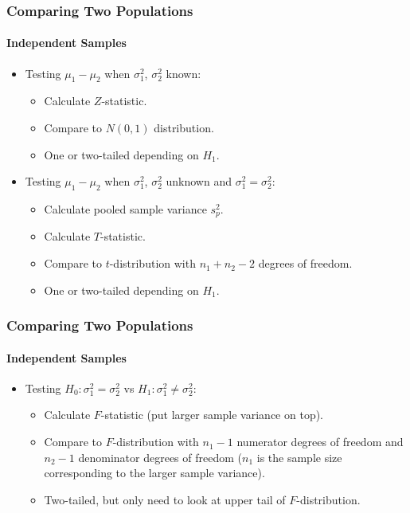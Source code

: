 \documentclass[12pt]{beamer}
\begin{document}
\begin{frame}
	\frametitle{Comparing Two Populations}
	\framesubtitle{Independent Samples}
	
	\begin{itemize}[label={\color{blue}$\blacktriangleright$}]
		\item Testing $\mu_1 - \mu_2$ when $\sigma_1^2$, $\sigma_2^2$ known:
		\begin{itemize}[label={\color{blue}$\blacktriangleright$}]
			\item Calculate $Z$-statistic.
			\item Compare to $N(0,1)$ distribution.
			\item One or two-tailed depending on $H_1$.
		\end{itemize}
		
		\item Testing $\mu_1 - \mu_2$ when $\sigma_1^2$, $\sigma_2^2$ unknown and $\sigma_1^2 = \sigma_2^2$:
		\begin{itemize}[label={\color{blue}$\blacktriangleright$}]
			\item Calculate pooled sample variance $s_p^2$.
			\item Calculate $T$-statistic.
			\item Compare to $t$-distribution with $n_1 + n_2 - 2$ degrees of freedom.
			\item One or two-tailed depending on $H_1$.
		\end{itemize}
	\end{itemize}
	
\end{frame}
\begin{frame}
	\frametitle{Comparing Two Populations}
	\framesubtitle{Independent Samples}
	
	\begin{itemize}[label={\color{blue}$\blacktriangleright$}]
		\item Testing $H_0 : \sigma_1^2 = \sigma_2^2$ vs $H_1 : \sigma_1^2 \neq \sigma_2^2$:
		\begin{itemize}[label={\color{blue}$\blacktriangleright$}]
			\item Calculate $F$-statistic (put larger sample variance on top).
			\item Compare to $F$-distribution with $n_1 - 1$ numerator degrees of freedom and $n_2 - 1$ denominator degrees of freedom ($n_1$ is the sample size corresponding to the larger sample variance).
			\item Two-tailed, but only need to look at upper tail of $F$-distribution.
		\end{itemize}
	\end{itemize}
	
\end{frame}
\end{document}

